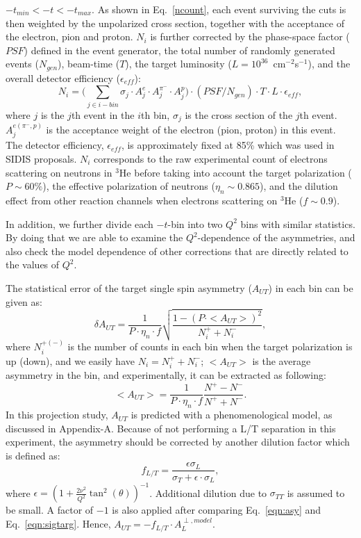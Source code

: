 $-t_{min}<-t<-t_{max}$. As shown in Eq.~\ref{ncount}, each event surviving the
cuts is then weighted by the unpolarized cross section, together with the
acceptance of the electron, pion and proton. $N_{i}$ is further corrected by
the phase-space factor ($PSF$) defined in the event generator, the total number
of randomly generated events ($N_{gen}$), beam-time ($T$), the target
luminosity ($L=10^{36}$~cm$^{-2}$s$^{-1}$), and the overall detector efficiency 
($\epsilon_{eff}$):
 \begin{equation}
     N_{i} = \bigl(\sum_{j\in i-bin} \sigma_{j}\cdot A^{e}_{j} \cdot
     A^{\pi^{-}}_{j} \cdot A^{p}_{j}\bigr) \cdot (PSF/N_{gen}) \cdot T \cdot L \cdot
     \epsilon_{eff},
     \label{ncount}
 \end{equation}
where $j$ is the $j$th event in the $i$th bin, $\sigma_{j}$ is the cross
section of the $j$th event. $A^{e(\pi^{-},p)}_{j}$ is the acceptance weight of the
electron (pion, proton) in this event. The detector efficiency,
$\epsilon_{eff}$, is approximately fixed at 85\% which was used in SIDIS
proposals. $N_{i}$ corresponds to the raw experimental count of electrons
scattering on neutrons in $\mathrm{^{3}He}$ before taking into account the
target polarization ($P\sim60\%$), the effective polarization of neutrons
($\eta_{n}\sim0.865$), and the dilution effect from other reaction channels
when electrons scattering on $\mathrm{^{3}He}$ ($f \sim 0.9$). 

In addition, we further divide each $-t$-bin into two $Q^{2}$ bins with similar statistics. 
By doing that we are able to examine the $Q^{2}$-dependence of the asymmetries, 
and also check the model dependence of other corrections that are directly related to the values of $Q^{2}$.

The statistical error of the target single spin asymmetry ($A_{UT}$) in each bin can be given
as:
  \begin{equation}
    \delta A_{UT} = \frac{1}{P\cdot\eta_{n}\cdot f} \sqrt{\frac{1-(P\cdot
        <A_{UT}>)^{2}}{N^{+}_{i}+N^{-}_{i}}},
    \label{stat_err}
 \end{equation}
where $N^{+(-)}_{i}$ is the number of counts in each bin when the target
polarization is up (down), and we easily have $N_{i}=N^{+}_{i}+N^{-}_{i}$;
$<A_{UT}>$ is the average asymmetry in the bin, and experimentally, it can be
extracted as following:
\begin{equation}
   <A_{UT}> = \frac{1}{P\cdot\eta_{n}\cdot f} \frac{N^{+}-N^{-}}{N^{+}+N^{-}}.
   \label{asym_exp}
\end{equation}
In this projection study, $A_{UT}$ is predicted with a phenomenological model,
as discussed in Appendix-A. Because of not performing a L/T separation in this
experiment, the asymmetry should be corrected by another dilution factor which
is defined as:
\begin{equation}
  f_{L/T} =\frac{\epsilon\sigma_{L} }{\sigma_{T}+\epsilon\cdot\sigma_{L} },
\end{equation} 
where $\epsilon=(1+\frac{2\nu^{2}}{Q^{2}}\tan^{2}(\theta))^{-1}$. Additional dilution
due to $\sigma_{TT}$ is assumed to be small.  A factor of $-1$ is also applied after comparing Eq.~\ref{eqn:asy} and Eq.~\ref{eqn:sigtarg}. Hence, $A_{UT} = -f_{L/T}\cdot A_{L}^{\perp,model}$.


